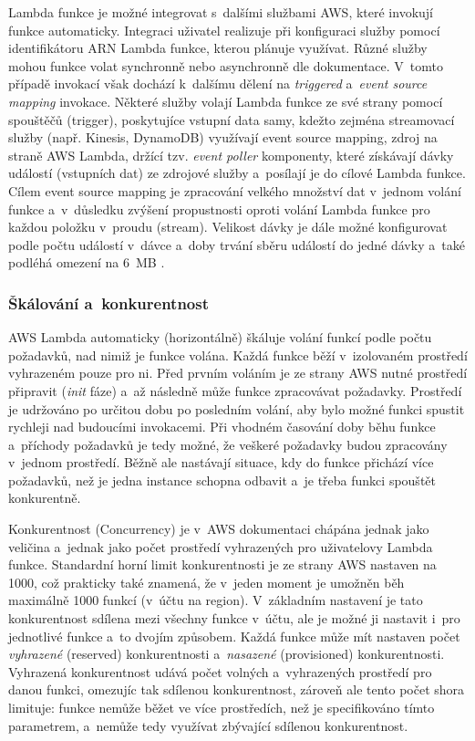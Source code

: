 \documentclass[czech, ing, kiv, he, iso690]{fasthesis}
\begin{document}
Lambda funkce je možné integrovat s~dalšími službami AWS, které invokují funkce automaticky. Integraci uživatel realizuje při konfiguraci služby pomocí identifikátoru ARN Lambda funkce, kterou plánuje využívat. Různé služby mohou funkce volat synchronně nebo asynchronně dle dokumentace. V~tomto případě invokací však dochází k~dalšímu dělení na \emph{triggered} a~\emph{event source mapping} invokace. Některé služby volají Lambda funkce ze své strany pomocí spouštěčů (trigger), poskytujíce vstupní data samy, kdežto zejména streamovací služby (např. Kinesis, DynamoDB) využívají event source mapping, zdroj na straně AWS Lambda, držící tzv. \emph{event poller} komponenty, které získávají dávky událostí (vstupních dat) ze zdrojové služby a~posílají je do cílové Lambda funkce. Cílem event source mapping je zpracování velkého množství dat v~jednom volání funkce a~v~důsledku zvýšení propustnosti oproti volání Lambda funkce pro každou položku v~proudu (stream). Velikost dávky je dále možné konfigurovat podle počtu událostí v~dávce a~doby trvání sběru událostí do jedné dávky a~také podléhá omezení na 6~MB \cite{lambda.docs.aws}.

\subsubsection{Škálování a~konkurentnost}
AWS Lambda automaticky (horizontálně) škáluje volání funkcí podle počtu požadavků, nad nimiž je funkce volána. Každá funkce běží v~izolovaném prostředí vyhrazeném pouze pro ni. Před prvním voláním je ze strany AWS nutné prostředí připravit (\emph{init} fáze) a~až následně může funkce zpracovávat požadavky. Prostředí je udržováno po určitou dobu po posledním volání, aby bylo možné funkci spustit rychleji nad budoucími invokacemi. Při vhodném časování doby běhu funkce a~příchody požadavků je tedy možné, že veškeré požadavky budou zpracovány v~jednom prostředí. Běžně ale nastávají situace, kdy do funkce přichází více požadavků, než je jedna instance schopna odbavit a~je třeba funkci spouštět konkurentně.

Konkurentnost (Concurrency) je v~AWS dokumentaci chápána jednak jako veličina a~jednak jako počet prostředí vyhrazených pro uživatelovy Lambda funkce. Standardní horní limit konkurentnosti je ze strany AWS nastaven na 1000, což prakticky také znamená, že v~jeden moment je umožněn běh maximálně 1000 funkcí (v~účtu na region). V~základním nastavení je tato konkurentnost sdílena mezi všechny funkce v~účtu, ale je možné ji nastavit i~pro jednotlivé funkce a~to dvojím způsobem. Každá funkce může mít nastaven počet \emph{vyhrazené} (reserved) konkurentnosti a~\emph{nasazené} (provisioned) konkurentnosti. Vyhrazená konkurentnost udává počet volných a~vyhrazených prostředí pro danou funkci, omezujíc tak sdílenou konkurentnost, zároveň ale tento počet shora limituje: funkce nemůže běžet ve více prostředích, než je specifikováno tímto parametrem, a~nemůže tedy využívat zbývající sdílenou konkurentnost.
\end{document}
